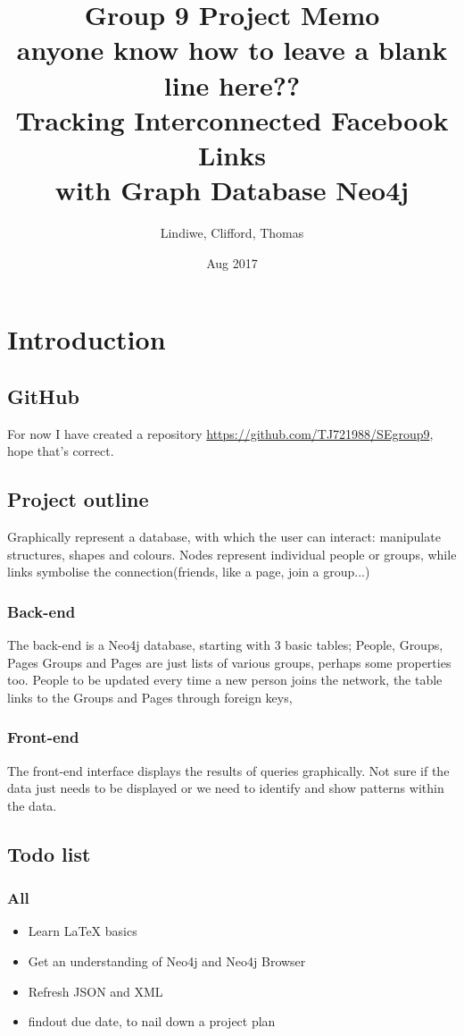 \documentclass[11pt]{article}
\title{%
Group 9 Project Memo\\\large
\color{red}anyone know how to leave a blank line here??\\
\color{black}
Tracking Interconnected Facebook Links\\
with Graph Database Neo4j}
\date{Aug 2017}
\author{Lindiwe, Clifford, Thomas}
\begin{document}
\maketitle
{}
\newpage
\tableofcontents
\newpage
{}
\section{Introduction}
\subsection{GitHub}
For now I have created a repository \url{https://github.com/TJ721988/SEgroup9}, hope that's correct.

\subsection{Project outline}
Graphically represent a database, with which the user can interact: manipulate structures, shapes and colours. 
Nodes represent individual people or groups, while links symbolise the connection(friends, like a page, join a group...)
\subsubsection{Back-end}
The back-end is a Neo4j database, starting with 3 basic tables; People, Groups, Pages
Groups and Pages are just lists of various groups, perhaps some properties too.
People to be updated every time a new person joins the network, the table links to the Groups and Pages through foreign keys,

\subsubsection{Front-end}
The front-end interface displays the results of queries graphically. 
Not sure if the data just needs to be displayed or we need to identify and show patterns within the data. 

\subsection{Todo list}
\subsubsection{All}
\begin{itemize}
\item Learn LaTeX basics
\item Get an understanding of Neo4j and Neo4j Browser
\item Refresh JSON and XML
\item findout due date, to nail down a project plan
\end{itemize}
\end{document}

